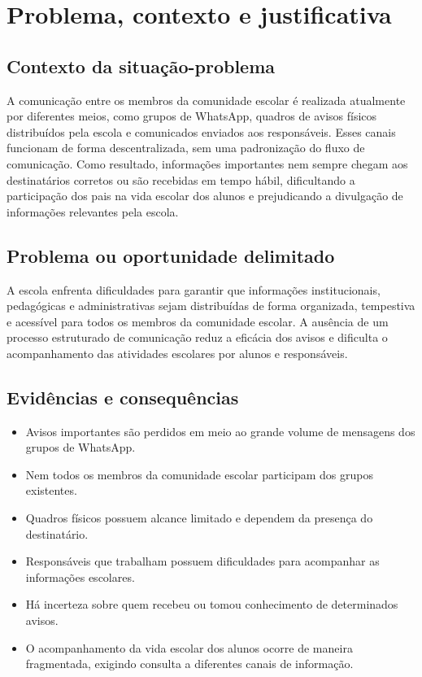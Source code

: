 \section{Problema, contexto e justificativa}
\subsection{Contexto da situação-problema}
A comunicação entre os membros da comunidade escolar é realizada atualmente por diferentes meios, como grupos de WhatsApp, quadros de avisos físicos distribuídos pela escola e comunicados enviados aos responsáveis. Esses canais funcionam de forma descentralizada, sem uma padronização do fluxo de comunicação. Como resultado, informações importantes nem sempre chegam aos destinatários corretos ou são recebidas em tempo hábil, dificultando a participação dos pais na vida escolar dos alunos e prejudicando a divulgação de informações relevantes pela escola.

\subsection{Problema ou oportunidade delimitado}
A escola enfrenta dificuldades para garantir que informações institucionais, pedagógicas e administrativas sejam distribuídas de forma organizada, tempestiva e acessível para todos os membros da comunidade escolar. A ausência de um processo estruturado de comunicação reduz a eficácia dos avisos e dificulta o acompanhamento das atividades escolares por alunos e responsáveis.

\subsection{Evidências e consequências}
\begin{itemize}
\item Avisos importantes são perdidos em meio ao grande volume de mensagens dos grupos de WhatsApp.
\item Nem todos os membros da comunidade escolar participam dos grupos existentes.
\item Quadros físicos possuem alcance limitado e dependem da presença do destinatário.
\item Responsáveis que trabalham possuem dificuldades para acompanhar as informações escolares.
\item Há incerteza sobre quem recebeu ou tomou conhecimento de determinados avisos.
\item O acompanhamento da vida escolar dos alunos ocorre de maneira fragmentada, exigindo consulta a diferentes canais de informação.
\end{itemize}

